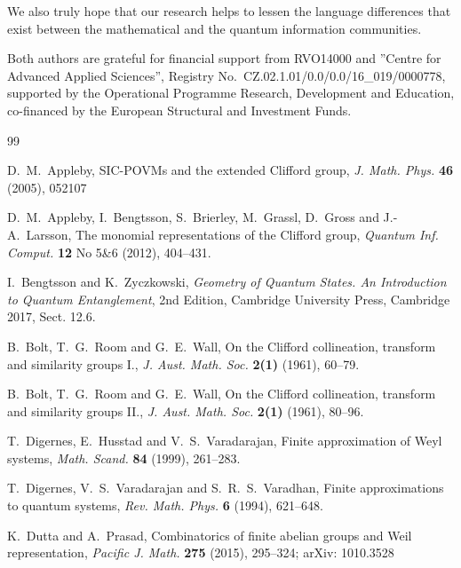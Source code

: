 \documentclass[10pt]{amsart}
\theoremstyle{plain}
\theoremstyle{definition}
\theoremstyle{remark}%
\begin{document}
We also truly hope that our research helps to lessen 
the language differences that exist between the mathematical 
and the quantum information communities. 


Both authors are grateful for financial support from RVO14000 and 
”Centre for Advanced Applied Sciences”, 
Registry No.~CZ.02.1.01/0.0/0.0/16\_019/0000778, 
supported by the Operational Programme Research, Development and Education, 
co-financed by the European Structural and Investment Funds.



\begin{thebibliography}{99}


	
D.~M.~Appleby, SIC-POVMs and the extended Clifford group, 
\textit{J. Math. Phys.} \textbf{46} (2005), 052107
	
	
D.~M.~Appleby, I.~Bengtsson, S.~Brierley, M.~Grassl, D.~Gross and J.-A.~Larsson,
The monomial representations of the Clifford group,
\textit{Quantum Inf. Comput.} \textbf{12} No 5\&6 (2012), 404--431.

	
I.~Bengtsson and K.~Zyczkowski, 
\textit{Geometry of Quantum	States. An Introduction to Quantum Entanglement},
2nd Edition, Cambridge University Press, Cambridge 2017, Sect. 12.6.

B.~Bolt, T.~G.~Room and G.~E.~Wall, On the Clifford collineation, transform and similarity groups I., 
\textit{J. Aust. Math. Soc.} \textbf{2(1)} (1961), 60--79.
	
B.~Bolt, T.~G.~Room and G.~E.~Wall, On the Clifford collineation, transform and similarity groups II., 
\textit{J. Aust. Math. Soc.} \textbf{2(1)} (1961), 80--96.


T.~Digernes, E.~Husstad and V.~S.~Varadarajan,  
Finite approximation of Weyl systems, 
\textit{Math. Scand.} {\bf 84} (1999), 261--283.

T.~Digernes, V.~S.~Varadarajan and S.~R.~S.~Varadhan,  
Finite approximations to quantum systems, 
\textit{Rev. Math. Phys.} {\bf 6} (1994), 621--648.


K.~Dutta and A.~Prasad, 
Combinatorics of finite abelian groups and Weil representation,
\textit{Pacific J. Math.} \textbf{275} (2015), 295--324;
arXiv: 1010.3528
	

\end{thebibliography}
\end{document}
